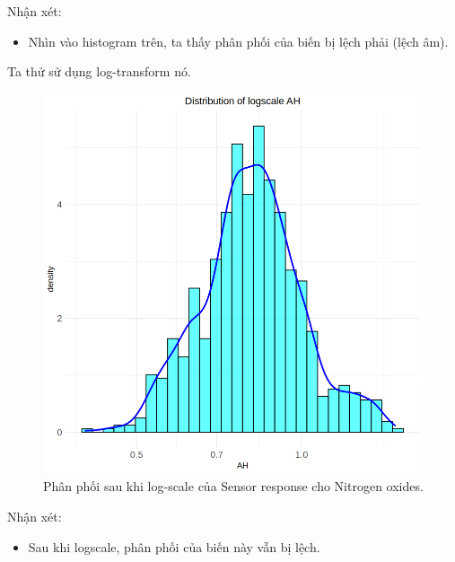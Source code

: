 Nhận xét:
\begin{itemize}
    \item Nhìn vào histogram trên, ta thấy phân phối của biến bị lệch phải (lệch âm).
\end{itemize}

Ta thử sử dụng log-transform nó.

\begin{figure}[H]
    \centering
    \includegraphics[width=0.75\columnwidth]{air_figures/AH_logscale_distribution.png}
    \caption{Phân phối sau khi log-scale của Sensor response cho Nitrogen oxides.}
    \label{fig:ah_logscale_distribution}
\end{figure}
Nhận xét:
\begin{itemize}
    \item Sau khi logscale, phân phối của biến này vẫn bị lệch.
\end{itemize}

